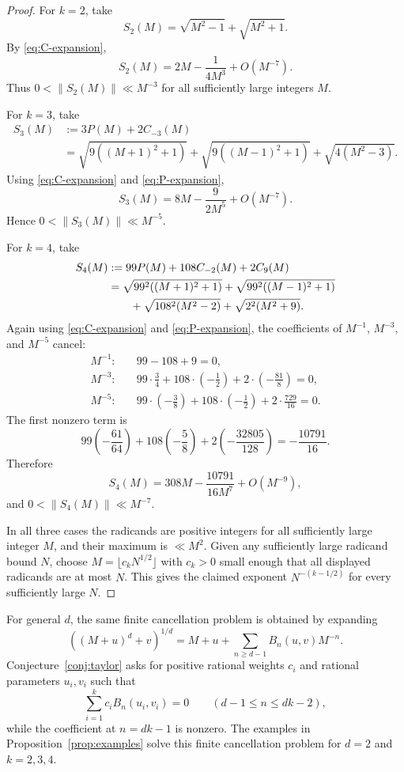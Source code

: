 \documentclass[11pt]{article}
\theoremstyle{remark}
\begin{document}
\begin{proof}
For $k=2$, take
\[
  S_2(M)=\sqrt{M^2-1}+\sqrt{M^2+1}.
\]
By \eqref{eq:C-expansion},
\[
  S_2(M)=2M-\frac{1}{4M^3}+O(M^{-7}).
\]
Thus $0<\|S_2(M)\|\ll M^{-3}$ for all sufficiently large integers $M$.

\bigskip
\noindent
For $k=3$, take
\[
\begin{aligned}
  S_3(M)
  &:=3P(M)+2C_{-3}(M)\\
  &=\sqrt{9((M+1)^2+1)}
    +\sqrt{9((M-1)^2+1)}
    +\sqrt{4(M^2-3)}.
\end{aligned}
\]
Using \eqref{eq:C-expansion} and \eqref{eq:P-expansion},
\[
  S_3(M)=8M-\frac{9}{2M^5}+O(M^{-7}).
\]
Hence $0<\|S_3(M)\|\ll M^{-5}$.

\bigskip
\noindent
For $k=4$, take
\[
\begin{aligned}
  S_4(M)
  &:=99P(M)+108C_{-2}(M)+2C_9(M)\\
  &=\sqrt{99^2((M+1)^2+1)}
    +\sqrt{99^2((M-1)^2+1)}\\
  &\hspace{0.7cm}
    +\sqrt{108^2(M^2-2)}
    +\sqrt{2^2(M^2+9)}.
\end{aligned}
\]
Again using \eqref{eq:C-expansion} and \eqref{eq:P-expansion}, the coefficients of $M^{-1}$, $M^{-3}$, and $M^{-5}$ cancel:
\[
\begin{aligned}
  M^{-1}:&\quad 99-108+9=0,\\
  M^{-3}:&\quad 99\cdot\frac34+108\cdot\left(-\frac12\right)
  +2\cdot\left(-\frac{81}{8}\right)=0,\\
  M^{-5}:&\quad 99\cdot\left(-\frac38\right)+108\cdot\left(-\frac12\right)
  +2\cdot\frac{729}{16}=0.
\end{aligned}
\]
The first nonzero term is
\[
  99\left(-\frac{61}{64}\right)
  +108\left(-\frac58\right)
  +2\left(-\frac{32805}{128}\right)
  =-\frac{10791}{16}.
\]
Therefore
\[
  S_4(M)=308M-\frac{10791}{16M^7}+O(M^{-9}),
\]
and $0<\|S_4(M)\|\ll M^{-7}$.

\bigskip
\noindent
In all three cases the radicands are positive integers for all sufficiently large integer $M$, and their maximum is $\ll M^2$. Given any sufficiently large radicand bound $N$, choose $M=\lfloor c_k N^{1/2}\rfloor$ with $c_k>0$ small enough that all displayed radicands are at most $N$. This gives the claimed exponent $N^{-(k-1/2)}$ for every sufficiently large $N$.
\end{proof}

\smallskip
\noindent
For general $d$, the same finite cancellation problem is obtained by expanding
\[
  \left((M+u)^d+v\right)^{1/d}
  =M+u+\sum_{n\geq d-1} B_n(u,v)M^{-n}.
\]
Conjecture~\ref{conj:taylor} asks for positive rational weights $c_i$ and rational parameters $u_i,v_i$ such that
\[
  \sum_{i=1}^k c_i B_n(u_i,v_i)=0
  \qquad(d-1\leq n\leq dk-2),
\]
while the coefficient at $n=dk-1$ is nonzero. The examples in Proposition~\ref{prop:examples} solve this finite cancellation problem for $d=2$ and $k=2,3,4$.
\end{document}
